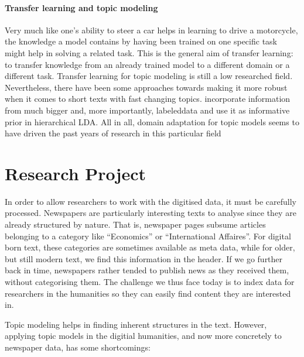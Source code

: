 \paragraph{Transfer learning and topic modeling}
Very much like one's ability to steer a car helps in learning to drive a motorcycle, the knowledge a model contains by having been trained on one specific task might help in solving a related task. This is the general aim of transfer learning: to transfer knowledge from an already trained model to a different domain or a different task.  Transfer learning for topic modeling is still a low researched field. Nevertheless, there have been some approaches towards making it more robust when it comes to short texts with fast changing topics. \citet{kang2013} incorporate information from much bigger and, more importantly, labeleddata and use it as informative prior in hierarchical LDA.  All in all, domain adaptation for topic models seems to have driven the past years of research in this particular field \citep{pmlr-v32-chenf14,Faisal:2013:TLU:2483325.2483473}

\section{Research Project}

In order to allow researchers to work with the digitised data, it must be carefully processed. Newspapers are particularly interesting texts to analyse since they are already structured by nature. That is, newspaper pages subsume articles belonging to a category like ``Economics'' or ``International Affaires''. For digital born text, these categories are sometimes available as meta data, while for older, but still modern text, we find this information in the header. If we go further back in time, newspapers rather tended to publish news as they received them, without categorising them. The challenge we thus face today is to index data for researchers in the humanities so they can easily find content they are interested in.

Topic modeling helps in finding inherent structures in the text. However, applying topic models in the digitial humanities, and now more concretely to newspaper data, has some shortcomings: 

